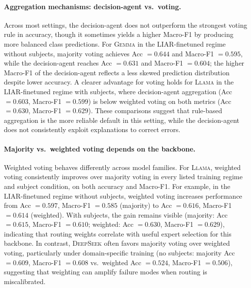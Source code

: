 \paragraph{Aggregation mechanisms: decision-agent vs.\ voting.}
Across most settings, the decision-agent does not outperform the strongest voting rule in accuracy, though it sometimes yields a higher Macro-F1 by producing more balanced class predictions.
For \textsc{Gemma} in the LIAR-finetuned regime without subjects, majority voting achieves Acc $=0.644$ and Macro-F1 $=0.595$, while the decision-agent reaches Acc $=0.631$ and Macro-F1 $=0.604$; the higher Macro-F1 of the decision-agent reflects a less skewed prediction distribution despite lower accuracy.
A clearer advantage for voting holds for \textsc{Llama} in the LIAR-finetuned regime with subjects, where decision-agent aggregation (Acc $=0.603$, Macro-F1 $=0.599$) is below weighted voting on both metrics (Acc $=0.630$, Macro-F1 $=0.629$).
These comparisons suggest that rule-based aggregation is the more reliable default in this setting, while the decision-agent does not consistently exploit explanations to correct errors.

\paragraph{Majority vs.\ weighted voting depends on the backbone.}
Weighted voting behaves differently across model families.
For \textsc{Llama}, weighted voting consistently improves over majority voting in every listed training regime and subject condition, on both accuracy and Macro-F1.
For example, in the LIAR-finetuned regime without subjects, weighted voting increases performance from Acc $=0.597$, Macro-F1 $=0.585$ (majority) to Acc $=0.616$, Macro-F1 $=0.614$ (weighted).
With subjects, the gain remains visible (majority: Acc $=0.615$, Macro-F1 $=0.610$; weighted: Acc $=0.630$, Macro-F1 $=0.629$), indicating that routing weights correlate with useful expert selection for this backbone.
In contrast, \textsc{DeepSeek} often favors majority voting over weighted voting, particularly under domain-specific training (no subjects: majority Acc $=0.609$, Macro-F1 $=0.608$ vs.\ weighted Acc $=0.524$, Macro-F1 $=0.506$), suggesting that weighting can amplify failure modes when routing is miscalibrated.

